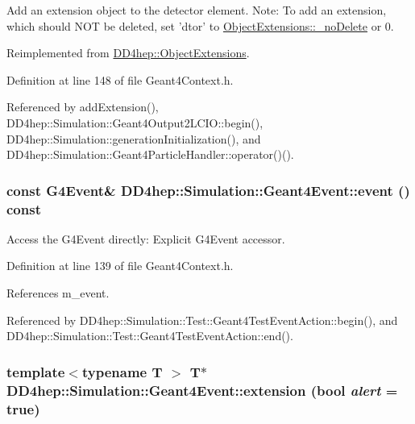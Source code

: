 Add an extension object to the detector element. Note: To add an extension, which should NOT be deleted, set 'dtor' to \hyperlink{class_d_d4hep_1_1_object_extensions_a0c32fb2af89407102b494ab9c15f9eac}{ObjectExtensions::\_\-noDelete} or 0. 

Reimplemented from \hyperlink{class_d_d4hep_1_1_object_extensions_a9e4010c2b9cbfda1455c10821a3cae85}{DD4hep::ObjectExtensions}.

Definition at line 148 of file Geant4Context.h.

Referenced by addExtension(), DD4hep::Simulation::Geant4Output2LCIO::begin(), DD4hep::Simulation::generationInitialization(), and DD4hep::Simulation::Geant4ParticleHandler::operator()().\hypertarget{class_d_d4hep_1_1_simulation_1_1_geant4_event_a85bac44c4e4c1d442df960361cda94fc}{
\subsubsection[{event}]{\setlength{\rightskip}{0pt plus 5cm}const G4Event\& DD4hep::Simulation::Geant4Event::event () const}}
\label{class_d_d4hep_1_1_simulation_1_1_geant4_event_a85bac44c4e4c1d442df960361cda94fc}


Access the G4Event directly: Explicit G4Event accessor. 

Definition at line 139 of file Geant4Context.h.

References m\_\-event.

Referenced by DD4hep::Simulation::Test::Geant4TestEventAction::begin(), and DD4hep::Simulation::Test::Geant4TestEventAction::end().\hypertarget{class_d_d4hep_1_1_simulation_1_1_geant4_event_afb5a4367c7a4ef75dc716eceef3f2b87}{
\subsubsection[{extension}]{\setlength{\rightskip}{0pt plus 5cm}template$<$typename T $>$ {\bf T}$\ast$ DD4hep::Simulation::Geant4Event::extension (bool {\em alert} = {\ttfamily true})}}
\label{class_d_d4hep_1_1_simulation_1_1_geant4_event_afb5a4367c7a4ef75dc716eceef3f2b87}



